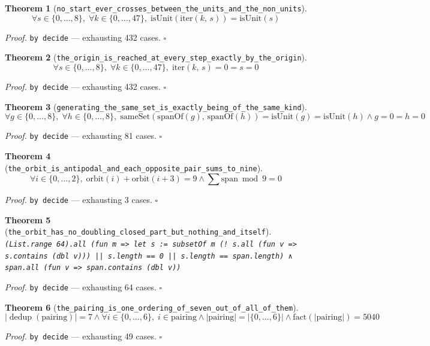 \documentclass[11pt]{article}
\newtheorem{theorem}{Theorem}[section]
\begin{document}
\begin{theorem}[\texttt{no\_start\_ever\_crosses\_between\_the\_units\_and\_the\_non\_units}]
\[ \forall s \in \{0,\dots,8\},\; \forall k \in \{0,\dots,47\},\; \mathrm{isUnit}\mathopen{}\left(\mathrm{iter}\mathopen{}\left(k,\,s\right)\right) = \mathrm{isUnit}\mathopen{}\left(s\right) \]
\end{theorem}
\noindent\emph{Proof.} \texttt{by decide} --- exhausting 432 cases. \hfill$\square$

\begin{theorem}[\texttt{the\_origin\_is\_reached\_at\_every\_step\_exactly\_by\_the\_origin}]
\[ \forall s \in \{0,\dots,8\},\; \forall k \in \{0,\dots,47\},\; \mathrm{iter}\mathopen{}\left(k,\,s\right) = 0 = s = 0 \]
\end{theorem}
\noindent\emph{Proof.} \texttt{by decide} --- exhausting 432 cases. \hfill$\square$

\begin{theorem}[\texttt{generating\_the\_same\_set\_is\_exactly\_being\_of\_the\_same\_kind}]
\[ \forall g \in \{0,\dots,8\},\; \forall h \in \{0,\dots,8\},\; \mathrm{sameSet}\mathopen{}\left(\mathrm{spanOf}\mathopen{}\left(g\right),\,\mathrm{spanOf}\mathopen{}\left(h\right)\right) = \mathrm{isUnit}\mathopen{}\left(g\right) = \mathrm{isUnit}\mathopen{}\left(h\right) \land g = 0 = h = 0 \]
\end{theorem}
\noindent\emph{Proof.} \texttt{by decide} --- exhausting 81 cases. \hfill$\square$

\begin{theorem}[\texttt{the\_orbit\_is\_antipodal\_and\_each\_opposite\_pair\_sums\_to\_nine}]
\[ \forall i \in \{0,\dots,2\},\; \mathrm{orbit}\mathopen{}\left(i\right) + \mathrm{orbit}\mathopen{}\left(i + 3\right) = 9 \land \sum \mathrm{span} \bmod 9 = 0 \]
\end{theorem}
\noindent\emph{Proof.} \texttt{by decide} --- exhausting 3 cases. \hfill$\square$

\begin{theorem}[\texttt{the\_orbit\_has\_no\_doubling\_closed\_part\_but\_nothing\_and\_itself}]
\texttt{(List.range 64).all (fun m => let s := subsetOf m (! s.all (fun v => s.contains (dbl v))) || s.length == 0 || s.length == span.length) ∧ span.all (fun v => span.contains (dbl v))}
\end{theorem}
\noindent\emph{Proof.} \texttt{by decide} --- exhausting 64 cases. \hfill$\square$

\begin{theorem}[\texttt{the\_pairing\_is\_one\_ordering\_of\_seven\_out\_of\_all\_of\_them}]
\[ \left|\operatorname{dedup}\left(\mathrm{pairing}\right)\right| = 7 \land \forall i \in \{0,\dots,6\},\; i \in \mathrm{pairing} \land \left|\mathrm{pairing}\right| = \left|\{0,\dots,6\}\right| \land \mathrm{fact}\mathopen{}\left(\left|\mathrm{pairing}\right|\right) = 5040 \]
\end{theorem}
\noindent\emph{Proof.} \texttt{by decide} --- exhausting 49 cases. \hfill$\square$
\end{document}
